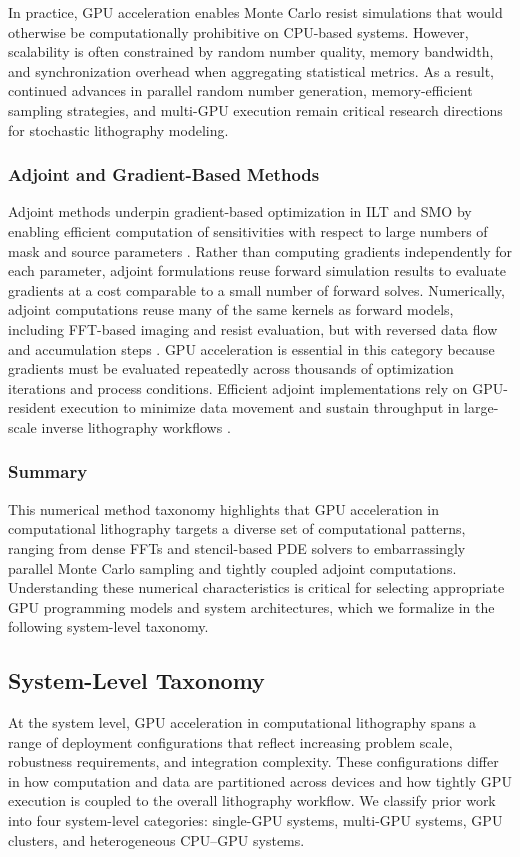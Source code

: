 \documentclass[pdflatex,sn-mathphys-num]{sn-jnl}%
\theoremstyle{thmstyleone}%
\theoremstyle{thmstyletwo}%
\theoremstyle{thmstylethree}%
\begin{document}
In practice, GPU acceleration enables Monte Carlo resist simulations that would otherwise be computationally prohibitive on CPU-based systems. However, scalability is often constrained by random number quality, memory bandwidth, and synchronization overhead when aggregating statistical metrics. As a result, continued advances in parallel random number generation, memory-efficient sampling strategies, and multi-GPU execution remain critical research directions for stochastic lithography modeling.

\subsubsection{Adjoint and Gradient-Based Methods}
Adjoint methods underpin gradient-based optimization in ILT and SMO by enabling efficient computation of sensitivities with respect to large numbers of mask and source parameters \cite{cecil2022advances}. Rather than computing gradients independently for each parameter, adjoint formulations reuse forward simulation results to evaluate gradients at a cost comparable to a small number of forward solves. Numerically, adjoint computations reuse many of the same kernels as forward models, including FFT-based imaging and resist evaluation, but with reversed data flow and accumulation steps \cite{yang2024gpuacceleratedinverselithographyhigh}. GPU acceleration is essential in this category because gradients must be evaluated repeatedly across thousands of optimization iterations and process conditions. Efficient adjoint implementations rely on GPU-resident execution to minimize data movement and sustain throughput in large-scale inverse lithography workflows \cite{Zheng2024}.

\subsubsection{Summary}
This numerical method taxonomy highlights that GPU acceleration in computational lithography targets a diverse set of computational patterns, ranging from dense FFTs and stencil-based PDE solvers to embarrassingly parallel Monte Carlo sampling and tightly coupled adjoint computations. Understanding these numerical characteristics is critical for selecting appropriate GPU programming models and system architectures, which we formalize in the following system-level taxonomy.


\subsection{System-Level Taxonomy}
At the system level, GPU acceleration in computational lithography spans a range of deployment configurations that reflect increasing problem scale, robustness requirements, and integration complexity. These configurations differ in how computation and data are partitioned across devices and how tightly GPU execution is coupled to the overall lithography workflow. We classify prior work into four system-level categories: single-GPU systems, multi-GPU systems, GPU clusters, and heterogeneous CPU–GPU systems.
\end{document}
